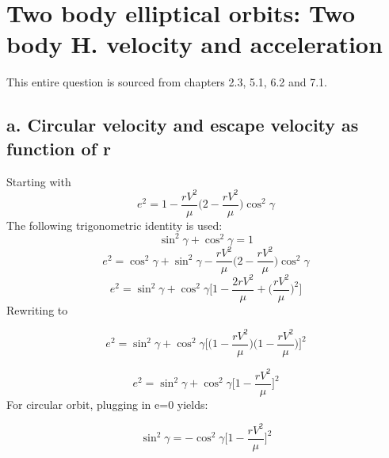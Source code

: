\section{ Two body elliptical orbits: Two body H. velocity and acceleration  }\label{sec:q2}    
This entire question is sourced from chapters 2.3, 5.1, 6.2 and 7.1.
\subsection{a. Circular velocity and escape velocity as function of r}
Starting with
\begin{equation}
e^2 = 1 - \frac{r V^2}{\mu}\Bigg(2 - \frac{r V^2}{\mu}\Bigg) \cos^2 \gamma
\label{start}
\end{equation}
The following trigonometric identity is used:
\begin{equation}
\sin^2\gamma + \cos^2\gamma = 1
\end{equation}
\begin{equation}
e^2 = \cos^2\gamma + \sin^2\gamma - \frac{r V^2}{\mu}\Bigg(2 - \frac{r V^2}{\mu}\Bigg) \cos^2 \gamma
\end{equation}
\begin{equation}
e^2 = \sin^2\gamma + \cos^2\gamma \Bigg[1-\frac{2rV^2}{\mu}+\Big(\frac{rV^2}{\mu}\Big)^2 \Bigg]
\end{equation}
Rewriting to

\begin{equation}
e^2 = \sin^2\gamma + \cos^2\gamma \Bigg[\Big(1-\frac{rV^2}{\mu}\Big)\Big(1-\frac{rV^2}{\mu}\Big)\Bigg]^2
\end{equation}

\begin{equation}
e^2 = \sin^2\gamma + \cos^2\gamma\Bigg[1-\frac{rV^2}{\mu}\Bigg]^2
\end{equation}
For circular orbit, plugging in e=0 yields:

\begin{equation}
\sin^2\gamma = -\cos^2\gamma\Bigg[1-\frac{rV^2}{\mu}\Bigg]^2
\end{equation}

